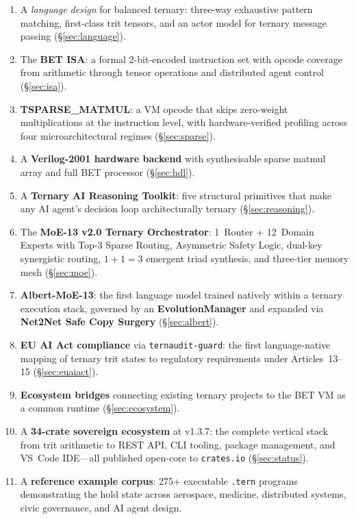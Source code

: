 \documentclass[journal,10pt,twocolumn]{IEEEtran}
\begin{document}
\begin{enumerate}
  \item A \emph{language design} for balanced ternary: three-way exhaustive
        pattern matching, first-class trit tensors, and an actor model for
        ternary message passing (\S\ref{sec:language}).
  \item The \textbf{BET ISA}: a formal 2-bit-encoded instruction set with
        opcode coverage from arithmetic through tensor operations and
        distributed agent control (\S\ref{sec:isa}).
  \item \textbf{TSPARSE\_MATMUL}: a VM opcode that skips zero-weight
        multiplications at the instruction level, with hardware-verified
        profiling across four microarchitectural regimes (\S\ref{sec:sparse}).
  \item A \textbf{Verilog-2001 hardware backend} with synthesisable sparse
        matmul array and full BET processor (\S\ref{sec:hdl}).
  \item A \textbf{Ternary AI Reasoning Toolkit}: five structural primitives
        that make any AI agent's decision loop architecturally ternary
        (\S\ref{sec:reasoning}).
  \item The \textbf{MoE-13 v2.0 Ternary Orchestrator}: 1~Router + 12~Domain
        Experts with Top-3 Sparse Routing, Asymmetric Safety Logic, dual-key
        synergistic routing, $1{+}1{=}3$ emergent triad synthesis, and
        three-tier memory mesh (\S\ref{sec:moe}).
  \item \textbf{Albert-MoE-13}: the first language model trained natively
        within a ternary execution stack, governed by an \textbf{EvolutionManager}
        and expanded via \textbf{Net2Net Safe Copy Surgery}
        (\S\ref{sec:albert}).
  \item \textbf{EU AI Act compliance} via \texttt{ternaudit-guard}: the
        first language-native mapping of ternary trit states to regulatory
        requirements under Articles~13--15 (\S\ref{sec:euaiact}).
  \item \textbf{Ecosystem bridges} connecting existing ternary projects to
        the BET VM as a common runtime (\S\ref{sec:ecosystem}).
  \item A \textbf{34-crate sovereign ecosystem} at v1.3.7: the complete
        vertical stack from trit arithmetic to REST API, CLI tooling,
        package management, and VS~Code IDE---all published open-core to
        \texttt{crates.io} (\S\ref{sec:status}).
  \item A \textbf{reference example corpus}: 275+ executable \texttt{.tern}
        programs demonstrating the hold state across aerospace, medicine,
        distributed systems, civic governance, and AI agent design.
\end{enumerate}
\end{document}
